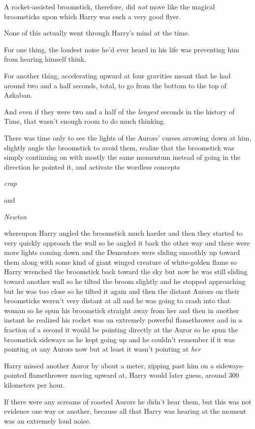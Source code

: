 A rocket-assisted broomstick, therefore, did \emph{not} move like the magical
broomsticks upon which Harry was such a very good flyer.

None of this actually went through Harry's mind at the time.

For one thing, the loudest noise he'd ever heard in his life was preventing him
from hearing himself think.

For another thing, accelerating upward at four gravities meant that he had
around two and a half seconds, total, to go from the bottom to the top of
Azkaban.

And even if they were two and a half of the \emph{longest} seconds in the
history of Time, that wasn't enough room to do much thinking.

There was time only to see the lights of the Aurors' curses arrowing down at
him, slightly angle the broomstick to avoid them, realize that the broomstick
was simply continuing on with mostly the same momentum instead of going in the
direction he pointed it, and activate the wordless concepts

\emph{crap}

and

\emph{Newton}

whereupon Harry angled the broomstick much harder and then they started to very
quickly approach the wall so he angled it back the other way and there were
more lights coming down and the Dementors were sliding smoothly up toward them
along with some kind of giant winged creature of white-golden flame so Harry
wrenched the broomstick back toward the sky but now he was still sliding toward
another wall so he tilted the broom slightly and he stopped approaching but he
was too close so he tilted it again and then the distant Aurors on their
broomsticks weren't very distant at all and he was going to crash into that
woman so he spun his broomstick straight away from her and then in another
instant he realized his rocket was an extremely powerful flamethrower and in a
fraction of a second it would be pointing directly at the Auror so he spun the
broomstick sideways as he kept going up and he couldn't remember if it was
pointing at any Aurors now but at least it wasn't pointing at \emph{her}

Harry missed another Auror by about a meter, zipping past him on a
sideways-pointed flamethrower moving upward at, Harry would later guess, around
300 kilometers per hour.

If there were any screams of roasted Aurors he didn't hear them, but this was
not evidence one way or another, because all that Harry was hearing at the
moment was an extremely loud noise.

